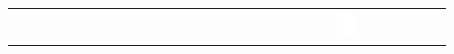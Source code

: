 \documentclass[10pt]{article}
\begin{document}
\begin{center}
\begin{tabular}{|c|c|c|c|c|c|c|c|c|c|c|c|c|c|c|c|c|c|c|c|c|c|c|c|c|c|c|c|c|c|}
 &  &  &  &  &  &  &  &  &  &  &  &  &  &  &  &  &  &  &  &  &  &  & \includegraphics[max width=\textwidth]{2024_11_21_6438f6dbc3784fe6d1deg-08}

\end{tabular}
\end{center}
\end{document}
